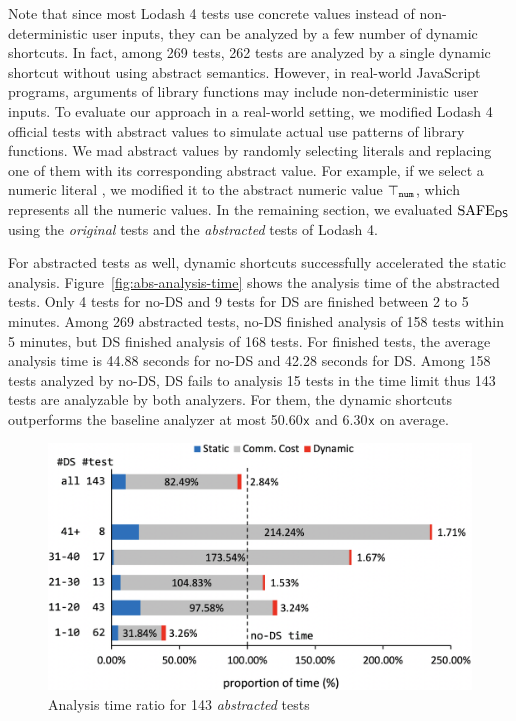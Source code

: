 Note that since most Lodash 4 tests use concrete values instead of
non-deterministic user inputs, they can be analyzed by a few number of dynamic shortcuts.
In fact, among 269 tests, 262 tests are analyzed
by a single dynamic shortcut without using abstract semantics.
However, in real-world JavaScript programs, arguments of library
functions may include non-deterministic user inputs.
To evaluate our approach in a real-world setting,
we modified Lodash 4 official tests with abstract values to simulate actual use patterns of library functions.
We mad abstract values by randomly selecting literals and replacing
one of them with its corresponding abstract value.
For example, if we select a numeric literal , we modified it to the abstract numeric value
$\top_{\texttt{num}}$, which represents all the numeric values.
In the remaining section, we evaluated $\text{SAFE}_{\textsf{DS}}$ using the \textit{original} tests
and the \textit{abstracted} tests of Lodash 4.

For abstracted tests as well, dynamic shortcuts successfully accelerated the static analysis.
Figure~\ref{fig:abs-analysis-time} shows the analysis time of the abstracted tests.
Only 4 tests for no-DS and 9 tests for DS are finished between 2 to 5 minutes.
Among 269 abstracted tests, no-DS finished analysis of 158 tests within 5 minutes,
but DS finished analysis of 168 tests.  For finished tests, the average analysis
time is 44.88 seconds for no-DS and 42.28 seconds for DS. Among 158 tests analyzed by no-DS, DS
fails to analysis 15 tests in the time limit thus 143 tests are analyzable by
both analyzers.  For them, the dynamic shortcuts outperforms the baseline
analyzer at most 50.60${\textsf{x}}$ and 6.30${\textsf{x}}$ on average.

\begin{figure}[t]
  \centering
  \includegraphics[width=\linewidth]{img/abs-analysis-ratio}
  \vspace*{-1.5em}
  \caption{Analysis time ratio for 143 \textit{abstracted} tests}
  \label{fig:abs-analysis-ratio}
  \vspace*{-1.5em}
\end{figure}

